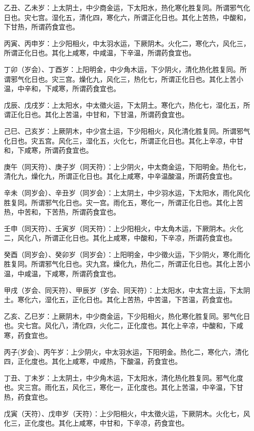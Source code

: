 \documentclass{article}%
\begin{document}
乙丑、乙未岁：上太阴土，中少商金运，下太阳水，热化寒化胜复同。所谓邪气化日也。灾七宫。湿化五，清化四，寒化六，所谓正化日也。其化上苦热，中酸和，下甘热，所谓药食宜也。

丙寅、丙申岁：上少阳相火，中太羽水运，下厥阴木。火化二，寒化六，风化三，所谓正化日也。其化上咸寒，中咸温，下辛温，所谓药食宜也。

丁卯（岁会）、丁酉岁：上阳明金，中少角木运，下少阴火，清化热化胜复同。所谓邪气化日也。灾三宫。燥化九，风化三，热化七，所谓正化日也。其化上苦小温，中辛和，下咸寒，所谓药食宜也。

戊辰、戊戌岁：上太阳水，中太徵火运，下太阴土。寒化六，热化七，湿化五，所谓正化日也。其化上苦温，中甘和，下甘温，所谓药食宜也。

己巳、己亥岁：上厥阴木，中少宫土运，下少阳相火，风化清化胜复同。所谓邪气化日也。灾五宫。风化三，湿化五，火化七，所谓正化日也。其化上辛凉，中甘和，下咸寒，所谓药食宜也。

庚午（同天符）、庚子岁（同天符）：上少阴火，中太商金运，下阳明金。热化七，清化九，燥化九，所谓正化日也。其化上咸寒，中辛温酸温，所谓药食宜也。

辛未（同岁会）、辛丑岁（同岁会）：上太阴土，中少羽水运，下太阳水，雨化风化胜复同。所谓邪气化日也。灾一宫。雨化五，寒化一，所谓正化日也。其化上苦热，中苦和，下苦热，所谓药食宜也。

壬申（同天符）、壬寅岁（同天符）：上少阳相火，中太角木运，下厥阴木。火化二，风化八，所谓正化日也。其化上咸寒，中酸和，下辛凉，所谓药食宜也。

癸酉（同岁会）、癸卯岁（同岁会）：上阳明金，中少徵火运，下少阴火，寒化雨化胜复同。所谓邪气化日也。灾九宫。燥化九，热化二，所谓正化日也。其化上苦小温，中咸温，下咸寒，所谓药食宜也。

甲戌（岁会、同天符）、甲辰岁（岁会、同天符）：上太阳水，中太宫土运，下太阴土。寒化六，湿化五，正化日也。其化上苦热，中苦温，下苦温，药食宜也。

乙亥、乙巳岁：上厥阴木，中少商金运，下少阳相火，热化寒化胜复同。邪气化日也。灾七宫。风化八，清化四，火化二，正化度也。其化上辛凉，中酸和，下咸寒，药食宜也。

丙子(岁会)、丙午岁：上少阴火，中太羽水运，下阳明金。热化二，寒化六，清化四，正化度也。其化上咸寒，中咸热，下酸温，药食宜也。

丁丑、丁未岁：上太阴土，中少角木运，下太阳水，清化热化胜复同。邪气化度也。灾三宫。雨化五，风化三，寒化一，正化度也。其化上苦温，中辛温，下甘热，药食宜也。

戊寅（天符）、戊申岁（天符）：上少阳相火，中太徵火运，下厥阴木。火化七，风化三，正化度也。其化上咸寒，中甘和，下辛凉，药食宜也。
\end{document}
